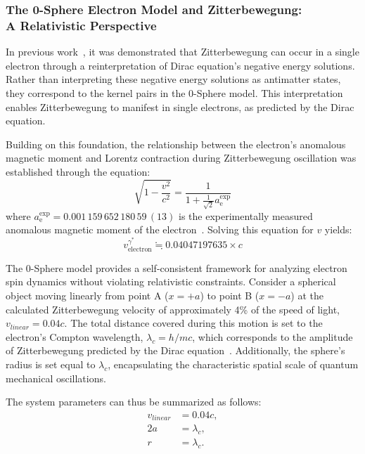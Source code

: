 \documentclass[%
 reprint,
 amsmath,amssymb,
 aps,
]{revtex4-1}
\numberwithin{equation}{section}%
\begin{document}
\vfill


\subsubsection{The 0-Sphere Electron Model and Zitterbewegung:\\ A Relativistic Perspective}
\label{subsec:0sphere_model_relativistic}

In previous work~\cite{Hanamura2023}, it was demonstrated that Zitterbewegung can occur in a single electron through a reinterpretation of Dirac equation's negative energy solutions. Rather than interpreting these negative energy solutions as antimatter states, they correspond to the kernel pairs in the 0-Sphere model. This interpretation enables Zitterbewegung to manifest in single electrons, as predicted by the Dirac equation.

Building on this foundation, the relationship between the electron's anomalous magnetic moment and Lorentz contraction during Zitterbewegung oscillation was established through the equation:
\begin{equation}
\label{eq:lorentz_anomalous}
\sqrt{1 - \frac{v^2}{c^2}} = \frac{1}{1 + \frac{1}{\sqrt{2}} a^{\text{exp}}_{\text{e}}}
\end{equation}
where $a^{\text{exp}}_{\text{e}} = 0.001\,159\,652\,180\,59\,(13)$ is the experimentally measured anomalous magnetic moment of the electron~\cite{Fan}. Solving this equation for $v$ yields:
\begin{equation}
\label{eq:zitter_velocity}
v_{\text{electron}}^{\gamma^{*}} \fallingdotseq 0.04047197635 \times c
\end{equation}

The 0-Sphere model provides a self-consistent framework for analyzing electron spin dynamics without violating relativistic constraints. Consider a spherical object moving linearly from point A ($x = +a$) to point B ($x = -a$) at the calculated Zitterbewegung velocity of approximately 4\% of the speed of light, $v_{linear} = 0.04c$. The total distance covered during this motion is set to the electron's Compton wavelength, $\lambda_c = h/mc$, which corresponds to the amplitude of Zitterbewegung predicted by the Dirac equation~\cite{Hestenes1990}. Additionally, the sphere's radius is set equal to $\lambda_c$, encapsulating the characteristic spatial scale of quantum mechanical oscillations.

The system parameters can thus be summarized as follows:
\begin{equation}
\label{eq:system_params_corrected}
\begin{aligned}
v_{linear} &= 0.04c, \\
2a &= \lambda_c, \\
r &= \lambda_c.
\end{aligned}
\end{equation}
\end{document}
